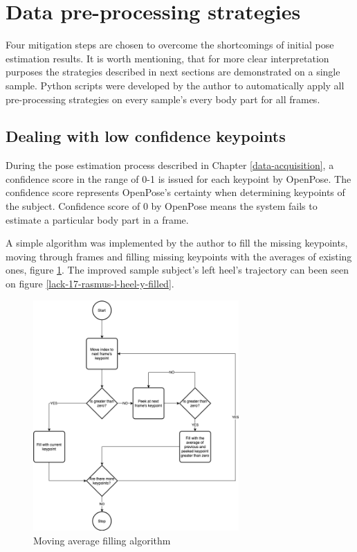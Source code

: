 \section{Data pre-processing strategies}
\label{data-pre-processing-strategies}

Four mitigation steps are chosen to overcome the shortcomings of initial pose estimation results. It is worth mentioning, that for more clear interpretation purposes the strategies described in next sections are demonstrated on a single sample. Python scripts were developed by the author to automatically apply all pre-processing strategies on every sample's every body part for all frames.

\subsection{Dealing with low confidence keypoints}

During the pose estimation process described in Chapter \ref{data-acquisition}, a confidence score in the range of 0-1 is issued for each keypoint by OpenPose. The confidence score represents OpenPose's certainty when determining keypoints of the subject. Confidence score of 0 by OpenPose means the system fails to estimate a particular body part in a frame. 

A simple algorithm was implemented by the author to fill the missing keypoints, moving through frames and filling missing keypoints with the averages of existing ones, figure \ref{moving-average-filling-algorithm}. The improved sample subject's left heel's trajectory can been seen on figure \ref{lack-17-rasmus-l-heel-y-filled}.

\begin{figure}[htb]
  \centering
    \includegraphics[width=0.7\textwidth,keepaspectratio]
    {images/data-preprocessing/moving-average-filling-algorithm}
    \caption{Moving average filling algorithm}
    \label{moving-average-filling-algorithm}
\end{figure}

